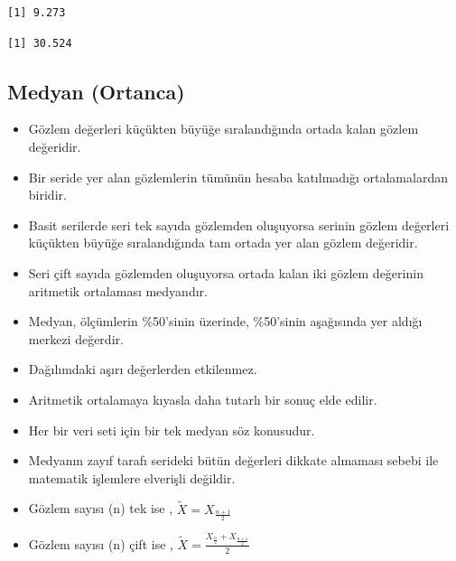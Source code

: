 \documentclass[
  letterpaper,
  DIV=11,
  numbers=noendperiod]{scrreprt}
\newenvironment{Shaded}{\begin{snugshade}}{\end{snugshade}}
\newcommand{\DecValTok}[1]{\textcolor[rgb]{0.68,0.00,0.00}{#1}}
\newcommand{\FunctionTok}[1]{\textcolor[rgb]{0.28,0.35,0.67}{#1}}
\newcommand{\NormalTok}[1]{\textcolor[rgb]{0.00,0.23,0.31}{#1}}
\newcommand{\SpecialCharTok}[1]{\textcolor[rgb]{0.37,0.37,0.37}{#1}}
\begin{document}
\begin{verbatim}
[1] 9.273
\end{verbatim}

\begin{Shaded}
\end{Shaded}

\begin{verbatim}
[1] 30.524
\end{verbatim}

\hypertarget{medyan-ortanca}{%
\subsection*{Medyan (Ortanca)}\label{medyan-ortanca}}

\begin{itemize}
\item
  Gözlem değerleri küçükten büyüğe sıralandığında ortada kalan gözlem
  değeridir.
\item
  Bir seride yer alan gözlemlerin tümünün hesaba katılmadığı
  ortalamalardan biridir.
\item
  Basit serilerde seri tek sayıda gözlemden oluşuyorsa serinin gözlem
  değerleri küçükten büyüğe sıralandığında tam ortada yer alan gözlem
  değeridir.
\item
  Seri çift sayıda gözlemden oluşuyorsa ortada kalan iki gözlem
  değerinin aritmetik ortalaması medyandır.
\item
  Medyan, ölçümlerin \%50'sinin üzerinde, \%50'sinin aşağısında yer
  aldığı merkezi değerdir.
\item
  Dağılımdaki aşırı değerlerden etkilenmez.
\item
  Aritmetik ortalamaya kıyasla daha tutarlı bir sonuç elde edilir.
\item
  Her bir veri seti için bir tek medyan söz konusudur.
\item
  Medyanın zayıf tarafı serideki bütün değerleri dikkate almaması sebebi
  ile matematik işlemlere elverişli değildir.
\item
  Gözlem sayısı (n) tek ise , \(\widetilde{X} = X_{\frac{n+1}{2}}\)
\item
  Gözlem sayısı (n) çift ise ,
  \(\widetilde{X} = \frac{X_\frac{n}{2}+X_{\frac{n+1}{2}}}{2}\)
\end{itemize}
\end{document}
